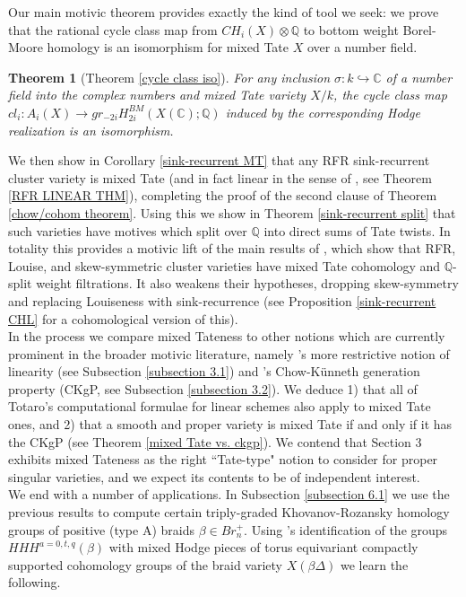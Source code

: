 \documentclass[11pt]{amsart}
\newtheorem{thm}{Theorem}[section]
\theoremstyle{definition}
\theoremstyle{remark}
\numberwithin{equation}{section}
\begin{document}
Our main motivic theorem provides exactly the kind of tool we seek: we prove that the rational cycle class map from $CH_i(X) \otimes \mathbb{Q}$ to bottom weight Borel-Moore homology is an isomorphism for mixed Tate $X$ over a number field.

\begin{thm}[Theorem \ref{cycle class iso}]
For any inclusion $\sigma: k \hookrightarrow \mathbb{C}$ of a number field into the complex numbers and mixed Tate variety $X/k$, the cycle class map $cl_i: A_i(X) \rightarrow gr_{-2i}H_{2i}^{BM}(X(\mathbb{C});\mathbb{Q})$ induced by the corresponding Hodge realization is an isomorphism.
\end{thm}

We then show in Corollary \ref{sink-recurrent MT} that any RFR sink-recurrent cluster variety is mixed Tate (and in fact linear in the sense of \cite{totaro2014chow}, see Theorem \ref{RFR LINEAR THM}), completing the proof of the second clause of Theorem \ref{chow/cohom theorem}. Using this we show in Theorem \ref{sink-recurrent split} that such varieties have motives which split over $\mathbb{Q}$ into direct sums of Tate twists. In totality this provides a motivic lift of the main results of \cite{lam2022cohomology}, which show that RFR, Louise, and skew-symmetric cluster varieties have mixed Tate cohomology and $\mathbb{Q}$-split weight filtrations. It also weakens their hypotheses, dropping skew-symmetry and replacing Louiseness with sink-recurrence (see Proposition \ref{sink-recurrent CHL} for a cohomological version of this).\\

In the process we compare mixed Tateness to other notions which are currently prominent in the broader motivic literature, namely \cite{totaro2014chow}'s more restrictive notion of linearity (see Subsection \ref{subsection 3.1}) and \cite{MR5083265}'s Chow-K\"unneth generation property (CKgP, see Subsection \ref{subsection 3.2}). We deduce 1) that all of Totaro's computational formulae for linear schemes also apply to mixed Tate ones, and 2) that a smooth and proper variety is mixed Tate if and only if it has the CKgP (see Theorem \ref{mixed Tate vs. ckgp}). We contend that Section 3 exhibits mixed Tateness as the right ``Tate-type" notion to consider for proper singular varieties, and we expect its contents to be of independent interest.\\

We end with a number of applications. In Subsection \ref{subsection 6.1} we use the previous results to compute certain triply-graded Khovanov-Rozansky homology groups of positive (type A) braids $\beta \in Br_n^+$. Using \cite{MR5110495}'s identification of the groups $HHH^{a = 0, t, q}(\beta)$ with mixed Hodge pieces of torus equivariant compactly supported cohomology groups of the braid variety $X(\beta \Delta)$ we learn the following.
\end{document}
